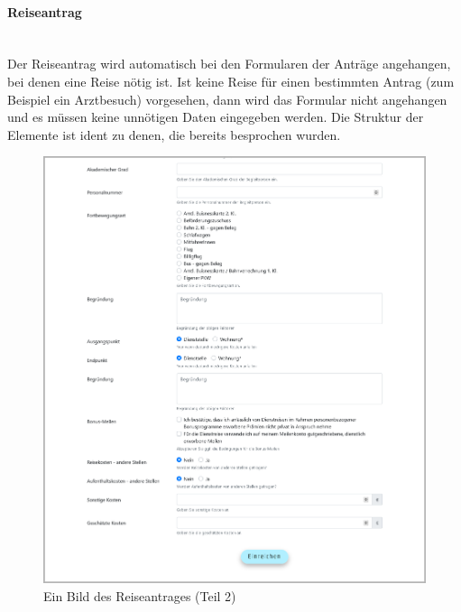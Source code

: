 \paragraph{Reiseantrag}
~\\
Der Reiseantrag wird automatisch bei den Formularen der Anträge angehangen, bei denen eine Reise nötig ist. Ist keine Reise für einen bestimmten Antrag (zum Beispiel ein Arztbesuch) vorgesehen, dann wird das Formular nicht angehangen und es müssen keine unnötigen Daten eingegeben werden. Die Struktur der Elemente ist ident zu denen, die bereits besprochen wurden.
\begin{figure}[H]
	\centering
	\includegraphics[width=1\linewidth]{images/website/zusatz_1}
	\caption[Neuer Schulantrag]{Ein Bild des Reiseantrages (Teil 2)}
	\label{fig:zusatz1}
\end{figure}


